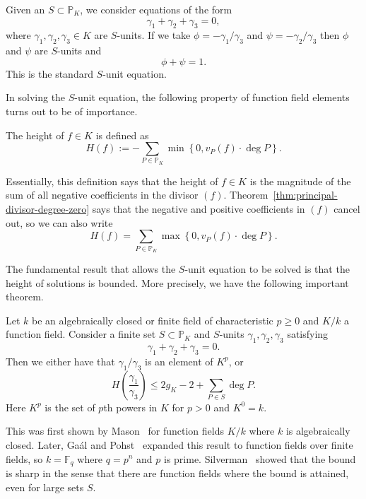 Given an \(S \subset \mathbb{P}_{K}\), we consider equations of the form
\[\gamma_{1} + \gamma_{2} + \gamma_{3} = 0,\]
where \(\gamma_{1}, \gamma_{2}, \gamma_{3} \in K\) are \(S\)-units. If we take \(\phi = -\gamma_{1} / \gamma_{3}\) and \(\psi = -\gamma_{2} / \gamma_{3}\) then \(\phi\) and \(\psi\) are \(S\)-units and
\[\phi + \psi = 1.\]
This is the standard \(S\)-unit equation.

In solving the \(S\)-unit equation, the following property of function field elements turns out to be of importance.

\begin{definition}%
  \label{def:height}
  The height of \(f \in K\) is defined as
  \[H(f) := - \sum_{P \in \mathbb{P}_{K}} \min{\left\{ 0, v_{P}(f) \cdot \deg{P} \right\}}.\]
\end{definition}

Essentially, this definition says that the height of \(f \in K\) is the magnitude of the sum of all negative coefficients in the divisor \((f)\). Theorem~\ref{thm:principal-divisor-degree-zero} says that the negative and positive coefficients in \((f)\) cancel out, so we can also write
\[H(f) = \sum_{P \in \mathbb{P}_{K}} \max{\left\{ 0, v_{P}(f) \cdot \deg{P} \right\}}.\]

The fundamental result that allows the \(S\)-unit equation to be solved is that the height of solutions is bounded. More precisely, we have the following important theorem.

\begin{theorem}%
  \label{thm:height-bound}
  Let \(k\) be an algebraically closed or finite field of characteristic \(p \geq 0\) and \(K / k\) a function field. Consider a finite set \(S \subset \mathbb{P}_{K}\) and \(S\)-units \(\gamma_{1}, \gamma_{2}, \gamma_{3}\) satisfying
  \[\gamma_{1} + \gamma_{2} + \gamma_{3} = 0.\]
  Then we either have that \(\gamma_{1}/\gamma_{3}\) is an element of \(K^{p}\), or
  \[H\left(\frac{\gamma_{1}}{\gamma_{3}}\right) \leq 2g_{K} - 2 + \sum_{P \in S} \deg{P}.\]
  Here \(K^{p}\) is the set of \(p\)th powers in \(K\) for \(p > 0\) and \(K^{0} = k\).
\end{theorem}

This was first shown by Mason~\cite[Lemma 10]{mason-1984-diophantine-equations-over} for function fields \(K / k\) where \(k\) is algebraically closed. Later, Ga\'{a}l and Pohst~\cite{gaal-2006-diophantine-equations-over} expanded this result to function fields over finite fields, so \(k = \mathbb{F}_{q}\) where \(q = p^{n}\) and \(p\) is prime. Silverman~\cite{silverman-1984-the-s-unit-equation} showed that the bound is sharp in the sense that there are function fields where the bound is attained, even for large sets \(S\).

